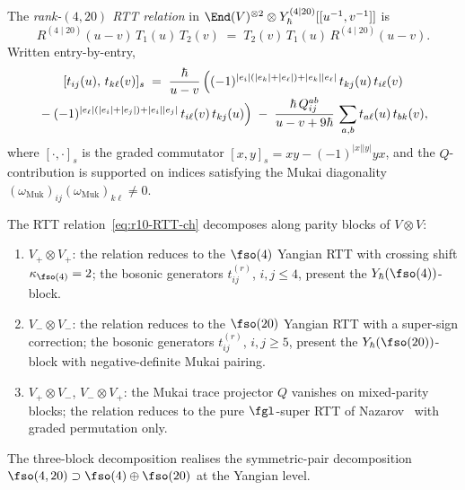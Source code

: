 \begin{definition}
\label{def:r10-RTT-ch}
The \emph{rank-$(4, 20)$ RTT relation} in $\End(V)^{\otimes 2}
\otimes Y^{(4 \mid 20)}_\hbar[[u^{-1}, v^{-1}]]$ is
\begin{equation}
 \label{eq:r10-RTT-ch}
 R^{(4 \mid 20)}(u - v)\, T_1(u)\, T_2(v)
 \;=\;
 T_2(v)\, T_1(u)\, R^{(4 \mid 20)}(u - v).
\end{equation}
Written entry-by-entry,
\begin{multline}
 \label{eq:r10-RTT-components-ch}
 [t_{ij}(u),\, t_{k\ell}(v)]_s
 \;=\;
 \frac{\hbar}{u - v}\,
 \Bigl(
 (-1)^{|e_i|(|e_k| + |e_\ell|) + |e_k||e_\ell|}\,
 t_{kj}(u)\, t_{i\ell}(v)
 \\[-0.5ex]
 {} -
 (-1)^{|e_\ell|(|e_i| + |e_j|) + |e_i||e_j|}\,
 t_{i\ell}(v)\, t_{kj}(u)
 \Bigr)
 \;-\;
 \frac{\hbar\, Q^{ab}_{ij}}{u - v + 9\hbar}\,
 \sum_{a, b} t_{a\ell}(u)\, t_{bk}(v),
\end{multline}
where $[\cdot, \cdot]_s$ is the graded commutator
$[x, y]_s = xy - (-1)^{|x||y|} yx$, and the $Q$-contribution is
supported on indices satisfying the Mukai diagonality
$(\omega_{\mathrm{Muk}})_{ij}(\omega_{\mathrm{Muk}})_{k\ell} \neq 0$.
\end{definition}

\begin{remark}
\label{rem:r10-RTT-blocks-ch}
The RTT relation~\eqref{eq:r10-RTT-ch} decomposes along parity blocks
of $V \otimes V$:
\begin{enumerate}[label=\textup{(\alph*)}]
\item $V_+ \otimes V_+$: the relation reduces to the $\fso(4)$
 Yangian RTT with crossing shift $\kappa_{\fso(4)} = 2$; the bosonic
 generators $t^{(r)}_{ij}$, $i, j \leq 4$, present the
 $Y_\hbar(\fso(4))$-block.
\item $V_- \otimes V_-$: the relation reduces to the $\fso(20)$
 Yangian RTT with a super-sign correction; the bosonic generators
 $t^{(r)}_{ij}$, $i, j \geq 5$, present the $Y_\hbar(\fso(20))$-block
 with negative-definite Mukai pairing.
\item $V_+ \otimes V_-$, $V_- \otimes V_+$: the Mukai trace projector
 $Q$ vanishes on mixed-parity blocks; the relation reduces to the
 pure $\fgl$-super RTT of Nazarov~\cite{Nazarov1991} with graded
 permutation only.
\end{enumerate}
The three-block decomposition realises the symmetric-pair
decomposition $\fso(4, 20) \supset \fso(4) \oplus \fso(20)$ at the
Yangian level.
\end{remark}

